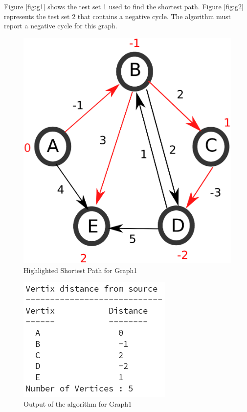 \documentclass[12pt]{article}
\begin{document}
Figure \ref{fig:g1} shows the test set 1 used to find the shortest path. Figure \ref{fig:g2} represents the test set 2 that contains a negative cycle. The algorithm must report a negative cycle for this graph.

\begin{figure}[h!]
\centering
	\includegraphics[scale=0.25]{./Figures/w1Graph1End.eps} 
	\caption{Highlighted Shortest Path for Graph1}
	\label{fig:g3}
\end{figure}

\begin{figure}[t!]
\centering
	\includegraphics[scale=0.70]{./Figures/w1Output1.png} 
	\caption{Output of the algorithm for Graph1}
	\label{fig:g4}
\end{figure}
\end{document}

